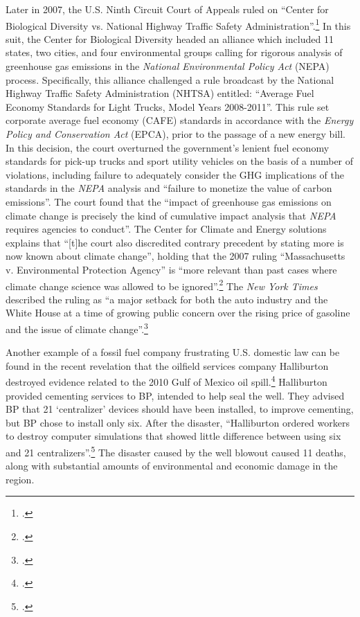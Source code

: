 Later in 2007, the U.S. Ninth Circuit Court of Appeals ruled on ``Center for Biological Diversity vs. National Highway Traffic Safety Administration''.\footcite[][]{9thcircuitHighway}
In this suit, the Center for Biological Diversity headed an alliance which included 11 states, two cities, and four environmental groups calling for rigorous analysis of greenhouse gas emissions in the \emph{National Environmental Policy Act} (NEPA) process. 
Specifically, this alliance challenged a rule broadcast by the National Highway Traffic Safety Administration (NHTSA) entitled: ``Average Fuel Economy Standards for Light Trucks, Model Years 2008-2011''.
This rule set corporate average fuel economy (CAFE) standards in accordance with the \emph{Energy Policy and Conservation Act} (EPCA), prior to the passage of a new energy bill.  
In this decision, the court overturned the government's lenient fuel economy standards for pick-up trucks and sport utility vehicles on the basis of a number of violations, including failure to adequately consider the GHG implications of the standards in the \emph{NEPA} analysis and ``failure to monetize the value of carbon emissions''.
The court found that the ``impact of greenhouse gas emissions on climate change is precisely the kind of cumulative impact analysis that \emph{NEPA} requires agencies to conduct''.
The Center for Climate and Energy solutions explains that ``[t]he court also discredited contrary precedent by stating more is now known about climate change'', holding that the 2007 ruling ``Massachusetts v. Environmental Protection Agency'' is ``more relevant than past cases where climate change science was allowed to be ignored''.\footcite[][]{NEPACases}
The \emph{New York Times} described the ruling as ``a major setback for both the auto industry and the White House at a time of growing public concern over the rising price of gasoline and the issue of climate change''.\footcite[][]{CourtRejectsTruckStandards}



Another example of a fossil fuel company frustrating U.S. domestic law can be found in the recent revelation that the oilfield services company Halliburton destroyed evidence related to the 2010 Gulf of Mexico oil spill.\footcite[][]{Halliburton2013}
Halliburton provided cementing services to BP, intended to help seal the well.
They advised BP that 21 `centralizer' devices should have been installed, to improve cementing, but BP chose to install only six.
After the disaster, ``Halliburton ordered workers to destroy computer simulations that showed little difference between using six and 21 centralizers''.\footcite[][]{Halliburton2013}
The disaster caused by the well blowout caused 11 deaths, along with substantial amounts of environmental and economic damage in the region.



